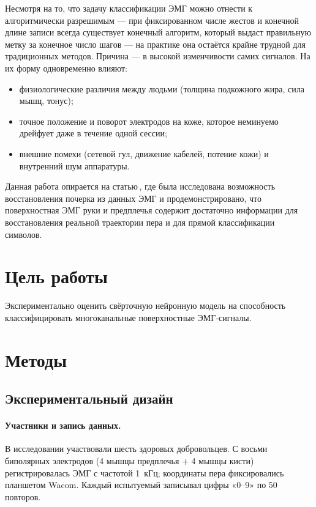 \documentclass[a4paper,12pt]{article}
\begin{document}
Несмотря на то, что задачу классификации ЭМГ можно отнести к алгоритмически разрешимым — при фиксированном числе жестов и конечной длине записи всегда существует конечный алгоритм, который выдаст правильную метку за конечное число шагов — на практике она остаётся крайне трудной для традиционных методов. Причина — в высокой изменчивости самих сигналов. На их форму одновременно влияют:
\begin{itemize}
    \item физиологические различия между людьми (толщина подкожного жира, сила мышц, тонус);
    \item точное положение и поворот электродов на коже, которое неминуемо дрейфует даже в течение одной сессии;
    \item внешние помехи (сетевой гул, движение кабелей, потение кожи) и внутренний шум аппаратуры.
\end{itemize}

Данная работа опирается на статью\,\cite{linderman2009}, где была исследована возможность восстановления почерка из данных ЭМГ и продемонстрировано, что поверхностная ЭМГ руки и предплечья содержит достаточно информации для восстановления реальной траектории пера и для прямой классификации символов.

\newpage

\section{Цель работы}
Экспериментально оценить свёрточную нейронную модель на способность классифицировать многоканальные поверхностные ЭМГ‑сигналы.

\newpage

\section{Методы}

\subsection{Экспериментальный дизайн}

\paragraph{Участники и запись данных.} В исследовании участвовали шесть здоровых добровольцев. С восьми биполярных электродов (4 мышцы предплечья + 4 мышцы кисти) регистрировалась ЭМГ с частотой 1~кГц; координаты пера фиксировались планшетом Wacom. Каждый испытуемый записывал цифры «0–9» по 50 повторов.
\end{document}
